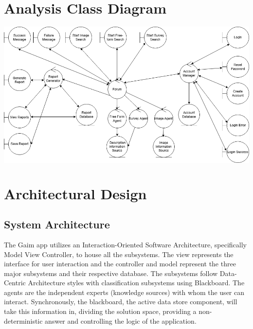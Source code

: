 \documentclass[]{article}
\begin{document}


\section{Analysis Class Diagram}
\label{sec:analysis_class_diagram}
\includegraphics[width=1\textwidth]{ACD.png}


\section{Architectural Design}
\label{sec:architectural_design}
\subsection{System Architecture}
\label{sub:system_architecture}
The Gaim app utilizes an Interaction-Oriented Software Architecture, specifically Model View Controller, to house all the subsystems. The view represents the interface for user interaction and the controller and model represent the three major subsystems and their respective database. The subsystems follow Data-Centric Architecture styles with classification subsystems using Blackboard. The agents are the independent experts (knowledge sources) with whom the user can interact. Synchronously, the blackboard, the active data store component, will take this information in, dividing the solution space, providing a non-deterministic answer and controlling the logic of the application. \\
\end{document}
